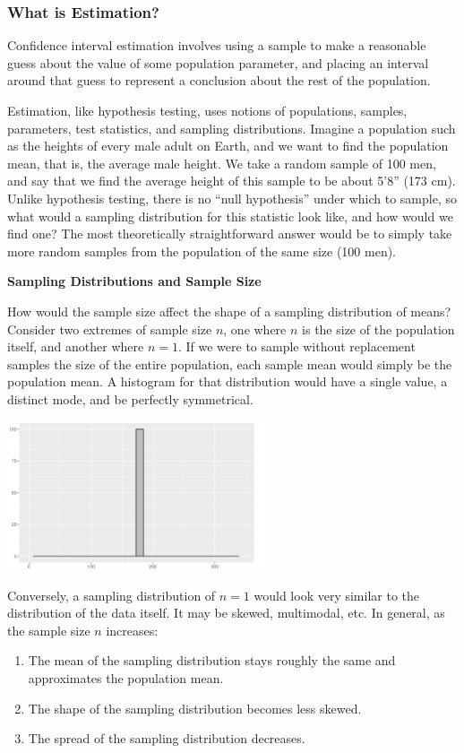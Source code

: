\documentclass[10pt]{article}
\newenvironment{aside}{\begin{tcolorbox}[colframe=white,colback=_grey2,arc=0pt,outer arc=0pt,breakable]}{\end{tcolorbox}}
\newcommand{\spacer}[0]{\par\vspace{0.1in}}
\begin{document}
\subsubsection{What is Estimation?}
Confidence interval estimation involves using a sample to make a reasonable guess about the value of some population parameter, and placing an interval around that guess to represent a conclusion about the rest of the population.
\spacer
Estimation, like hypothesis testing, uses notions of populations, samples, parameters, test statistics, and sampling distributions. Imagine a population such as the heights of every male adult on Earth, and we want to find the population mean, that is, the average male height. We take a random sample of 100 men, and say that we find the average height of this sample to be about 5'8'' (173 cm). Unlike hypothesis testing, there is no ``null hypothesis'' under which to sample, so what would a sampling distribution for this statistic look like, and how would we find one?  The most theoretically straightforward answer would be to simply take more random samples from the population of the same size (100 men).
\begin{aside}
    \textbf{Sampling Distributions and Sample Size}
    \spacer
    How would the sample size affect the shape of a sampling distribution of means? Consider two extremes of sample size $n$, one where $n$ is the size of the population itself, and another where $n=1$. If we were to sample without replacement samples the size of the entire population, each sample mean would simply be the population mean. A histogram for that distribution would have a single value, a distinct mode, and be perfectly symmetrical.
    \begin{center}
        \includegraphics[width=3in]{images/hist3.png}
    \end{center}
    Conversely, a sampling distribution of $n=1$ would look very similar to the distribution of the data itself. It may be skewed, multimodal, etc. In general, as the sample size $n$ increases:
    \begin{enumerate}
        \item The mean of the sampling distribution stays roughly the same and approximates the population mean.
        \item The shape of the sampling distribution becomes less skewed.
        \item The spread of the sampling distribution decreases.
    \end{enumerate}
\end{aside}
\end{document}
